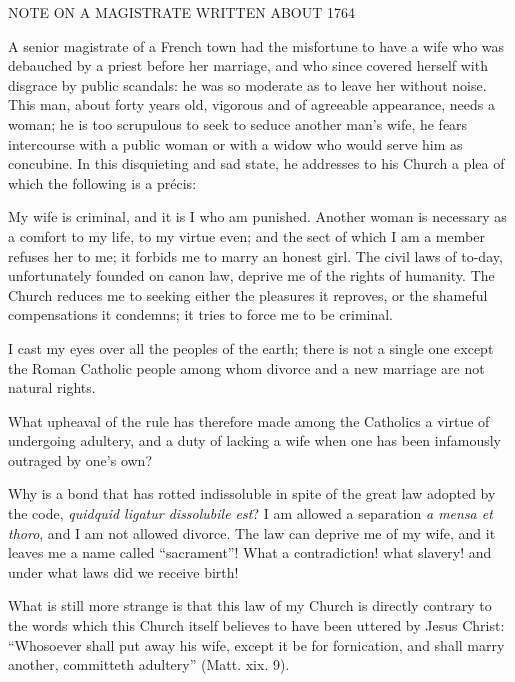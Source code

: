 


NOTE ON A MAGISTRATE WRITTEN ABOUT 1764







A senior magistrate of a French town had the misfortune to have a wife
who was debauched by a priest before her marriage, and who since covered
herself with disgrace by public scandals: he was so moderate as to leave
her without noise. This man, about forty years old, vigorous and of
agreeable appearance, needs a woman; he is too scrupulous to seek to
seduce another man's wife, he fears intercourse with a public woman or
with a widow who would serve him as concubine. In this disquieting and
sad state, he addresses to his Church a plea of which the following is a
précis:

My wife is criminal, and it is I who am punished. Another woman is
necessary as a comfort to my life, to my virtue even; and the sect of
which I am a member refuses her to me; it forbids me to marry an honest
girl. The civil laws of to-day, unfortunately founded on canon law,
deprive me of the rights of humanity. The Church reduces me to seeking
either the pleasures it reproves, or the shameful compensations it
condemns; it tries to force me to be criminal.

I cast my eyes over all the peoples of the earth; there is not a single
one except the Roman Catholic people among whom divorce and a new
marriage are not natural rights.

What upheaval of the rule has therefore made among the Catholics a
virtue of undergoing adultery, and a duty of lacking a wife when one has
been infamously outraged by one's own?

Why is a bond that has rotted indissoluble in spite of the great law
adopted by the code, \textit{quidquid ligatur dissolubile est}? I am allowed a
separation \textit{a mensa et thoro}, and I am not allowed divorce. The law
can deprive me of my wife, and it leaves me a name called \enquote{sacrament}!
What a contradiction! what slavery! and under what laws did we receive
birth!

What is still more strange is that this law of my Church is directly
contrary to the words which this Church itself believes to have been
uttered by Jesus Christ: \enquote{Whosoever shall put away his wife, except it
be for fornication, and shall marry another, committeth adultery} (Matt.
xix. 9).


